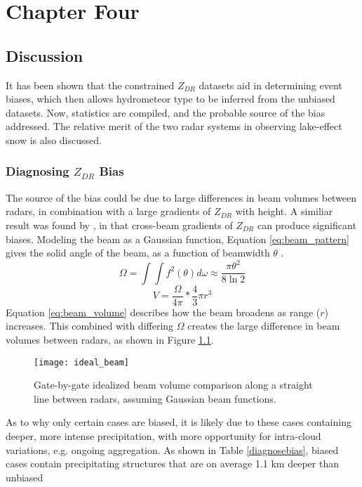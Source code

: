 \chapter{Chapter Four}
\section{Discussion}
It has been shown that the constrained $Z_{DR}$ datasets aid in determining event biases, which then allows hydrometeor type to be inferred from the unbiased
datasets. Now, statistics are compiled, and the probable source of the bias addressed. The relative merit of the two radar systems in observing lake-effect
snow is also discussed.
\subsection{Diagnosing $Z_{DR}$ Bias}
The source of the bias could be due to large differences in beam volumes between radars, in combination with a large gradients of $Z_{DR}$ with height. A similiar result was found by \citep{Ryzhkov2007a}, in that cross-beam gradients of $Z_{DR}$ can produce significant biases. Modeling the beam as a Gaussian function, Equation \ref{eq:beam_pattern} gives the solid angle of the beam, as a function of beamwidth $\theta$ \citep{Probert1962}. 
\begin{equation}\label{eq:beam_pattern}
\Omega = \int \int f^{2}(\theta) d\omega \approx \frac{\pi \theta^{2}}{8 \ln 2}
\end{equation}
\begin{equation}\label{eq:beam_volume}
V = \frac{\Omega}{4\pi} * \frac{4}{3} \pi r^{3}
\end{equation}
 Equation \ref{eq:beam_volume} describes how the beam broadens as range ($r$) increases.  This combined with 
 differing $\Omega$ creates the large difference in beam volumes between radars, as shown in Figure \ref{fig:ideal_beam}.
\begin{figure}[H]
\centering
\texttt{[image: ideal\_beam]}
\caption{Gate-by-gate idealized beam volume comparison along a straight line between radars, assuming Gaussian beam functions.} 
\label{fig:ideal_beam}
\end{figure}
 As to why only certain cases are biased, it is likely due to these cases containing deeper, more intense 
 precipitation, with more opportunity for intra-cloud variations, e.g. ongoing aggregation. As shown in Table \ref{diagnosebias}, biased cases contain precipitating structures that are on average 1.1 km deeper than unbiased 
